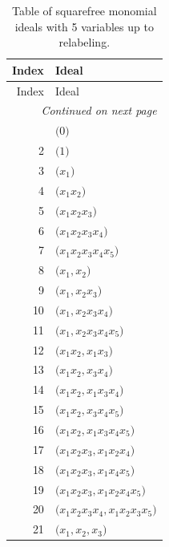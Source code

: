 
{\scriptsize
\begin{longtable}{@{}r>{\raggedright\arraybackslash}p{}@{}}
\caption{Table of squarefree monomial ideals with 5 variables up to relabeling.}
\label{table:monomial-ideal-index}\\
\toprule
Index & Ideal \\
\midrule
\endfirsthead
\toprule
Index & Ideal \\
\midrule
\endhead
\midrule
\multicolumn{2}{r}{\emph{Continued on next page}}\\
\midrule
\endfoot
\bottomrule
\endlastfoot
1 & \(\bigl(0\bigr)\) \\
2 & \(\bigl(1\bigr)\) \\
3 & \(\bigl(x_{1}\bigr)\) \\
4 & \(\bigl(x_{1}x_{2}\bigr)\) \\
5 & \(\bigl(x_{1}x_{2}x_{3}\bigr)\) \\
6 & \(\bigl(x_{1}x_{2}x_{3}x_{4}\bigr)\) \\
7 & \(\bigl(x_{1}x_{2}x_{3}x_{4}x_{5}\bigr)\) \\
8 & \(\bigl(x_{1},\allowbreak x_{2}\bigr)\) \\
9 & \(\bigl(x_{1},\allowbreak x_{2}x_{3}\bigr)\) \\
10 & \(\bigl(x_{1},\allowbreak x_{2}x_{3}x_{4}\bigr)\) \\
11 & \(\bigl(x_{1},\allowbreak x_{2}x_{3}x_{4}x_{5}\bigr)\) \\
12 & \(\bigl(x_{1}x_{2},\allowbreak x_{1}x_{3}\bigr)\) \\
13 & \(\bigl(x_{1}x_{2},\allowbreak x_{3}x_{4}\bigr)\) \\
14 & \(\bigl(x_{1}x_{2},\allowbreak x_{1}x_{3}x_{4}\bigr)\) \\
15 & \(\bigl(x_{1}x_{2},\allowbreak x_{3}x_{4}x_{5}\bigr)\) \\
16 & \(\bigl(x_{1}x_{2},\allowbreak x_{1}x_{3}x_{4}x_{5}\bigr)\) \\
17 & \(\bigl(x_{1}x_{2}x_{3},\allowbreak x_{1}x_{2}x_{4}\bigr)\) \\
18 & \(\bigl(x_{1}x_{2}x_{3},\allowbreak x_{1}x_{4}x_{5}\bigr)\) \\
19 & \(\bigl(x_{1}x_{2}x_{3},\allowbreak x_{1}x_{2}x_{4}x_{5}\bigr)\) \\
20 & \(\bigl(x_{1}x_{2}x_{3}x_{4},\allowbreak x_{1}x_{2}x_{3}x_{5}\bigr)\) \\
21 & \(\bigl(x_{1},\allowbreak x_{2},\allowbreak x_{3}\bigr)\) \\

\end{longtable}}
